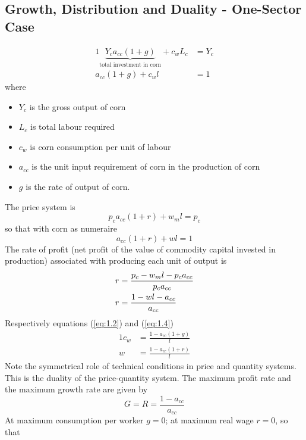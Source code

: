 \documentclass[a4paper,twoside]{article}
\numberwithin{equation}{section}
\numberwithin{figure}{section}
\begin{document}
\subsection{Growth, Distribution and Duality - One-Sector Case}
	\begin{alignat}{1}
		\underbrace{Y_c a_{cc}(1+g)}_{\text{total investment in corn}} + c_w L_c &= Y_c \label{eq:1.1}\\
		a_{cc} (1+g) + c_w l &= 1 \label{eq:1.2}
	\end{alignat}
	where
	\begin{itemize}
		\item \( Y_c \) is the gross output of corn
		\item \( L_c \) is total labour required
		\item \( c_w \) is corn consumption per unit of labour
		\item \( a_{cc} \) is the unit input requirement of corn in the production of corn 
		\item \( g \) is the rate of output of corn.
	\end{itemize}
	The price system is
	\begin{equation}
		p_c a_{cc} (1+r) + w_m l = p_c \label{eq:1.3}
	\end{equation}
	so that with corn as numeraire
	\begin{equation}
		a_{cc} (1+r) + wl = 1 \label{eq:1.4}
	\end{equation}
	The rate of profit (net profit of the value of commodity capital invested in production) associated with producing each unit of output is
	\begin{align}
		r &= \frac{p_c - w_m l - p_c a_{cc}}{p_c a_{cc}} \notag\\
		r &= \frac{1-wl-a_{cc}}{a_{cc}} 				 \label{eq:1.5}
	\end{align}
	Respectively equations (\ref{eq:1.2}) and (\ref{eq:1.4})
	\begin{alignat}{1}
		c_w &= \frac{1-a_{cc}(1+g)}{l} \label{eq:1.6}\\
		w   &= \frac{1-a_{cc}(1+r)}{l} \label{eq:1.7}
	\end{alignat}
	Note the symmetrical role of technical conditions in price and quantity systems. This is the duality of the price-quantity system. The maximum profit rate and the maximum growth rate are given by				
	\begin{equation}
		G = R = \frac{1-a_{cc}}{a_{cc}} \label{eq:1.8}
	\end{equation}
	At maximum consumption per worker \( g = 0 \); at maximum real wage \( r = 0 \), so that
\end{document}
